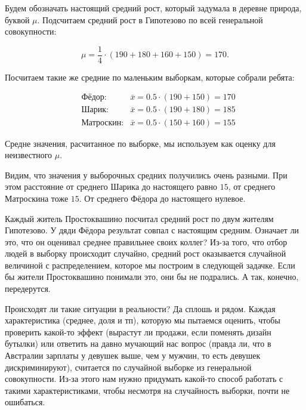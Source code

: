 \documentclass[12pt, a4paper, oneside]{article}
\begin{document}
\begin{sol}
Будем обозначать настоящий средний рост, который задумала в деревне природа, буквой $\mu$. Подсчитаем средний рост в Гипотезово  по всей генеральной совокупности: 

\[
\mu = \frac{1}{4} \cdot (190 + 180 + 160 + 150) = 170.
\]

Посчитаем такие же средние по маленьким выборкам, которые собрали ребята: 

\begin{equation*} 
\begin{aligned} 
& \text{Фёдор:}  & \bar{x} = 0.5 \cdot (190 + 150) = 170 \\
& \text{Шарик:}  & \bar{x} = 0.5 \cdot (190 + 180) = 185 \\
& \text{Матроскин:} & \bar{x} = 0.5 \cdot (150 + 160) = 155 
\end{aligned}
\end{equation*}

Средне значения, расчитанное по выборке, мы используем как оценку для неизвестного $\mu$.
 
Видим, что значения у выборочных средних получились очень разными. При этом расстояние от среднего Шарика до настоящего равно $15$, от среднего Матроскина тоже $15$. От среднего Фёдора до настоящего нулевое. 

Каждый житель Простоквашино посчитал средний рост по двум жителям Гипотезово. У дяди Фёдора результат совпал с настоящим средним. Означает ли это, что он оценивал среднее правильнее своих коллег?    Из-за того, что отбор людей в выборку происходит случайно, средний рост оказывается случайной величиной с распределением, которое мы построим в следующей задачке. Если бы жители Простоквашино понимали это, они бы не подрались. А так, конечно, передерутся. 

Происходят ли такие ситуации в реальности? Да сплошь и рядом. Каждая характеристика (среднее, доля и тп), которую мы пытаемся оценить, чтобы проверить какой-то эффект (вырастут ли продажи, если поменять дизайн бутылки) или ответить на давно мучающий нас вопрос (правда ли, что в Австралии зарплаты у девушек выше, чем у мужчин, то есть девушек дискриминируют), считается по случайной выборке из генеральной совокупности.  Из-за этого нам нужно придумать какой-то способ работать с такими характеристиками, чтобы несмотря на случайность выборки, почти не ошибаться. 
\end{sol}
\end{document}
